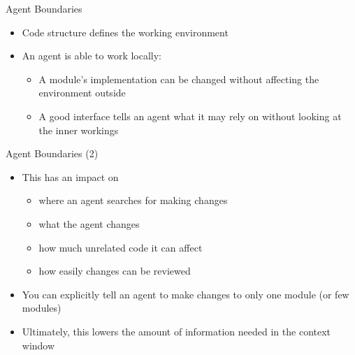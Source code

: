 \documentclass[
ps,
]{prosper}
\begin{document}
\begin{slide}{Agent Boundaries}

\begin{itemize}

\item Code structure defines the working environment

\item An agent is able to work locally:

  \begin{itemize}
    
  \item A module's implementation can be changed without affecting the
    environment outside

  \item A good interface tells an agent what it may rely on without looking at
    the inner workings
    
  \end{itemize}
  

\end{itemize}
  
\end{slide}





\begin{slide}{Agent Boundaries (2)}

\begin{itemize}

\item This has an impact on

  \begin{itemize}
    
  \item where an agent searches for making changes

  \item what the agent changes

  \item how much unrelated code it can affect

  \item how easily changes can be reviewed
    
  \end{itemize}

\item You can explicitly tell an agent to make changes to only one module (or
  few modules)

\item Ultimately, this lowers the amount of information needed in the context window
  
\end{itemize}
  
\end{slide}
\end{document}
